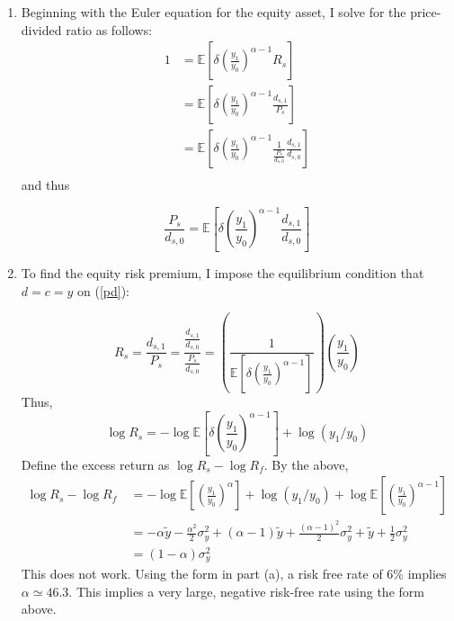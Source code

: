 \documentclass[11pt]{article}
\newcommand{\ev}{\mathbb{E}}
\begin{document}
\begin{enumerate}
\begin{enumerate}
		\item Beginning with the Euler equation for the equity asset, I solve for the price-divided ratio as follows:
		\begin{align*}
			1 &= \ev\left[\delta \left(\frac{y_1}{y_0}\right)^{\alpha - 1} R_s \right] \\
			&= \ev\left[\delta \left(\frac{y_1}{y_0}\right)^{\alpha - 1} \frac{d_{s,1}}{P_{s}} \right] \\
			&= \ev\left[\delta \left(\frac{y_1}{y_0}\right)^{\alpha - 1} \frac{1}{\frac{P_s}{d_{s,0}}} \frac{d_{s,1}}{d_{s,0}} \right] \\
		\end{align*}
		and thus

		\begin{equation}
			\frac{P_s}{d_{s,0}} = \ev\left[\delta \left(\frac{y_1}{y_0}\right)^{\alpha - 1} \frac{d_{s,1}}{d_{s,0}} \right] \label{pd}
		\end{equation}
		\item To find the equity risk premium, I impose the equilibrium condition that \(d = c = y\) on (\ref{pd}):
			
		\[R_s = \frac{d_{s,1}}{P_s} = \frac{\frac{d_{s,1}}{d_{s,0}}}{\frac{P_s}{d_{s,0}}} = \left( \frac{1}{\ev\left[\delta \left(\frac{y_1}{y_0}\right)^{\alpha - 1} \right]} \right) \left( \frac{y_1}{y_0} \right) \]
		Thus,
		\[\log R_s = -\log \ev\left[\delta \left(\frac{y_1}{y_0}\right)^{\alpha - 1} \right] + \log(y_1/y_0)\]
		Define the excess return as \(\log R_s - \log R_f\). By the above, 
		\begin{align*}
			\log R_s - \log R_f\ &= -\log \ev \left[ \left( \frac{y_1}{y_0} \right)^\alpha \right] + \log(y_1/y_0) + \log \ev \left[ \left( \frac{y_1}{y_0} \right)^{\alpha - 1} \right]\\
			&= -\alpha\tilde{y} - \frac{\alpha^2}{2} \sigma^2_y + (\alpha - 1)\tilde{y} + \frac{(\alpha - 1)^2}{2}\sigma^2_y + \tilde{y} + \frac{1}{2}\sigma^2_y \\
			&= (1 - \alpha)\sigma^2_y
		\end{align*}
		This does not work. Using the form in part (a), a risk free rate of 6\% implies \(\alpha \simeq 46.3\). This implies a very large, negative risk-free rate using the form above. 
	\end{enumerate}


\end{enumerate}
\end{document}
